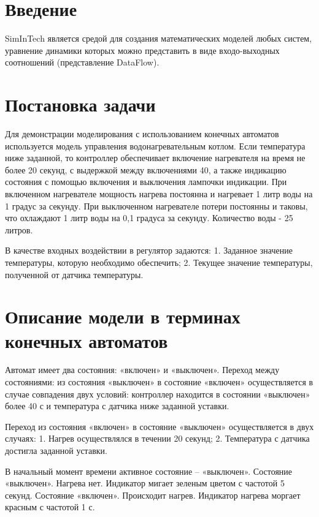 \documentclass{article}
\begin{document}


\section{Введение}
SimInTech является средой для создания математических моделей
любых систем, уравнение динамики которых можно представить в виде
входо-выходных соотношений (представление DataFlow). 

\section{Постановка задачи}

Для демонстрации моделирования с использованием конечных автоматов используется модель управления водонагревательным котлом. 
Если температура ниже заданной, то контроллер обеспечивает включение нагревателя на время не более 20 секунд, с выдержкой между включениями 40, а также индикацию состояния с помощью включения и выключения лампочки индикации.
При включенном нагревателе мощность нагрева постоянна и нагревает 1 литр воды на 1 градус за секунду.
При выключенном нагревателе потери постоянны и таковы, что охлаждают 1 литр воды на 0,1 градуса за секунду.
Количество воды - 25 литров.

В качестве входных воздействии в регулятор задаются:
1. Заданное значение температуры, которую необходимо обеспечить;
2. Текущее значение температуры, полученной от датчика температуры.

\section{Описание модели в терминах конечных автоматов}

Автомат имеет два состояния: «включен» и «выключен». Переход между состояниями: из состояния «выключен» в состояние «включен» осуществляется в случае совпадения двух условий: контроллер находится в состоянии «выключен» более 40 с и температура с датчика ниже заданной уставки.

Переход из состояния «включен» в состояние «выключен» осуществляется в двух случаях:
1. Нагрев осуществлялся в течении 20 секунд;
2. Температура с датчика достигла заданной уставки.

В начальный момент времени активное состояние – «выключен». Состояние «выключен». Нагрева нет. Индикатор мигает зеленым цветом с частотой 5 секунд.
Состояние «включен». Происходит нагрев. Индикатор нагрева моргает красным с частотой 1 с.
\end{document}
